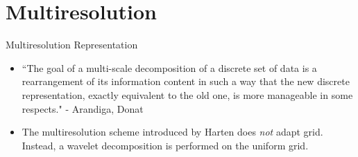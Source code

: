 \documentclass{beamer}
\begin{document}
\section{Multiresolution}

\begin{frame}{Multiresolution Representation}
    \begin{itemize}
        \item<1->``The goal of a multi-scale decomposition of a discrete set of
            data is a rearrangement of its information content in such a way
            that the new discrete representation, exactly equivalent to the old
            one, is more manageable in some respects." - Arandiga, Donat
        \item<2-> The multiresolution scheme introduced by Harten does
            \textit{not} adapt grid.  Instead, a wavelet decomposition is
            performed on the uniform grid.
    \end{itemize}
\end{frame}
\end{document}
